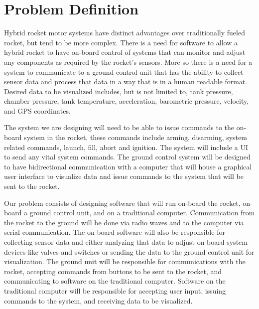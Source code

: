 \documentclass[10pt,draftclsnofoot,onecolumn]{IEEEtran}
\begin{document}
\section{Problem Definition}
Hybrid rocket motor systems have distinct advantages over traditionally fueled rocket, but tend to be more complex. There is a need for software to allow a hybrid rocket to have on-board control of systems that can monitor and adjust any components as required by the rocket's sensors.  More so there is a need for a system to communicate to a ground control unit that has the ability to collect sensor data and process that data in a way that is in a human readable format. Desired data to be visualized includes, but is not limited to, tank pressure, chamber pressure, tank temperature, acceleration, barometric pressure, velocity, and GPS coordinates.\par
The system we are designing will need to be able to issue commands to the on-board system in the rocket, these commands include arming, disarming, system related commands, launch, fill, abort and ignition. The system will include a UI to send any vital system commands. The ground control system will be designed to have bidirectional communication with a computer that will house a graphical user interface to visualize data and issue commands to the system that will be sent to the rocket.\par
Our problem consists of designing software that will run on-board the rocket, on-board a ground control unit, and on a traditional computer. Communication from the rocket to the ground will be done via radio waves and to the computer via serial communication. The on-board software will also be responsible for collecting sensor data and either analyzing that data to adjust on-board system devices like valves and switches or sending the data to the ground control unit for visualization.  The ground unit will  be responsible for communications with the rocket, accepting commands from buttons to be sent to the rocket, and communicating to software on the traditional computer. Software on the traditional computer will be responsible for accepting user input, issuing commands to the system, and receiving data to be visualized.
\end{document}
